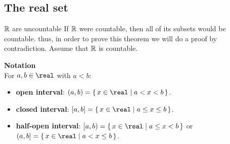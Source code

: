 \documentclass[../MATH-2000-Notes.tex]{subfiles}
\begin{document}
\subsection{The real set}
\begin{Theorem}
    {\(\mathbb{R}\) are uncountable}
    If \(\mathbb{R} \) were countable, then all of its subsets would be countable. thus, in order to prove this theorem we will do a proof by contradiction. Assume that \(\mathbb{R} \) is countable.
\end{Theorem}
\textbf{Notation}\\
For $a,b \in \real$ with $a < b$:
\begin{itemize}
    \item \textbf{open interval}:
          $(a,b) = \{\, x \in \real \mid a < x < b \,\}$.
    \item \textbf{closed interval}:
          $[a,b] = \{\, x \in \real \mid a \le x \le b \,\}$.
    \item \textbf{half-open interval}:
          $[a,b) = \{\, x \in \real \mid a \le x < b \,\}$
                          or $(a,b] = \{\, x \in \real \mid a < x \le b \,\}$.

\end{itemize}
\end{document}

